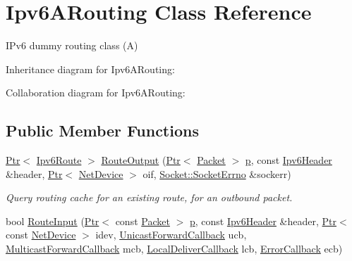 \hypertarget{classIpv6ARouting}{}\section{Ipv6\+A\+Routing Class Reference}
\label{classIpv6ARouting}


I\+Pv6 dummy routing class (A)  




Inheritance diagram for Ipv6\+A\+Routing\+:


Collaboration diagram for Ipv6\+A\+Routing\+:
\subsection*{Public Member Functions}
\begin{DoxyCompactItemize}
\item 
\hyperlink{classns3_1_1Ptr}{Ptr}$<$ \hyperlink{classns3_1_1Ipv6Route}{Ipv6\+Route} $>$ \hyperlink{classIpv6ARouting_a1e5c5092a6174c59041a66c9fcdfd86e}{Route\+Output} (\hyperlink{classns3_1_1Ptr}{Ptr}$<$ \hyperlink{classns3_1_1Packet}{Packet} $>$ \hyperlink{lte__link__budget__x2__handover__measures_8m_ac9de518908a968428863f829398a4e62}{p}, const \hyperlink{classns3_1_1Ipv6Header}{Ipv6\+Header} \&header, \hyperlink{classns3_1_1Ptr}{Ptr}$<$ \hyperlink{classns3_1_1NetDevice}{Net\+Device} $>$ oif, \hyperlink{classns3_1_1Socket_ada1328c5ae0c28cb2a982caf8f6d6cca}{Socket\+::\+Socket\+Errno} \&sockerr)
\begin{DoxyCompactList}\small\item\em Query routing cache for an existing route, for an outbound packet. \end{DoxyCompactList}\item 
bool \hyperlink{classIpv6ARouting_a6999910a5f726be9ece9891e1daa4cb9}{Route\+Input} (\hyperlink{classns3_1_1Ptr}{Ptr}$<$ const \hyperlink{classns3_1_1Packet}{Packet} $>$ \hyperlink{lte__link__budget__x2__handover__measures_8m_ac9de518908a968428863f829398a4e62}{p}, const \hyperlink{classns3_1_1Ipv6Header}{Ipv6\+Header} \&header, \hyperlink{classns3_1_1Ptr}{Ptr}$<$ const \hyperlink{classns3_1_1NetDevice}{Net\+Device} $>$ idev, \hyperlink{classns3_1_1Ipv6RoutingProtocol_a579fd6755ee873009819f7117371fea7}{Unicast\+Forward\+Callback} ucb, \hyperlink{classns3_1_1Ipv6RoutingProtocol_a5f12e04512ce8e5808c3cceff6b8918f}{Multicast\+Forward\+Callback} mcb, \hyperlink{classns3_1_1Ipv6RoutingProtocol_a93f6c06be1e024747e95f4299eba74a6}{Local\+Deliver\+Callback} lcb, \hyperlink{classns3_1_1Ipv6RoutingProtocol_abfdf43594e2ae97e1a4dc340e3a086a5}{Error\+Callback} ecb)

\end{DoxyCompactItemize}
